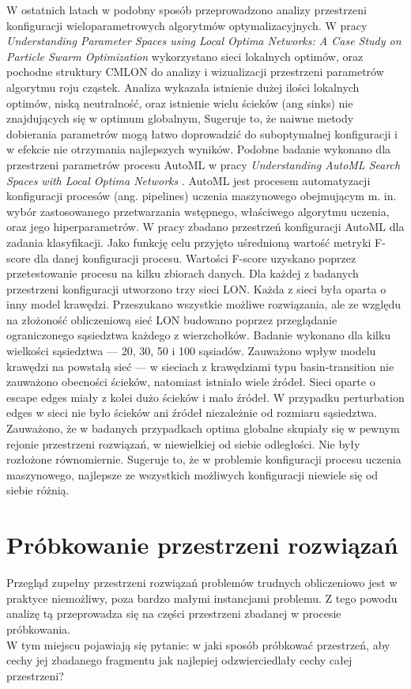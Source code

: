 W ostatnich latach w podobny sposób przeprowadzono analizy przestrzeni konfiguracji wieloparametrowych algorytmów optymalizacyjnych.
W pracy \textit{Understanding Parameter Spaces using Local Optima Networks: A Case Study on Particle Swarm Optimization} \cite{DBLP:conf/gecco/CleghornO21}
wykorzystano sieci lokalnych optimów, oraz pochodne struktury CMLON do analizy i wizualizacji przestrzeni parametrów algorytmu roju cząstek.
Analiza wykazała istnienie dużej ilości lokalnych optimów, niską neutralność, oraz istnienie wielu ścieków (ang sinks) nie znajdujących się w optimum globalnym,
Sugeruje to, że naiwne metody dobierania parametrów mogą łatwo doprowadzić do suboptymalnej konfiguracji i w efekcie nie otrzymania najlepszych wyników.
Podobne badanie wykonano dla przestrzeni parametrów procesu AutoML w pracy \textit{Understanding AutoML Search Spaces with Local Optima Networks} \cite{DBLP:conf/gecco/TeixeiraP22}.
AutoML jest procesem automatyzacji konfiguracji procesów (ang. pipelines) uczenia maszynowego obejmującym m. in. wybór zastosowanego przetwarzania wstępnego,
właściwego algorytmu uczenia, oraz jego hiperparametrów. W pracy zbadano przestrzeń konfiguracji AutoML dla zadania klasyfikacji.
Jako funkcję celu przyjęto uśrednioną wartość metryki F-score dla danej konfiguracji procesu.
Wartości F-score uzyskano poprzez przetestowanie procesu na kilku zbiorach danych.
Dla każdej z badanych przestrzeni konfiguracji utworzono trzy sieci LON. Każda z sieci była oparta o inny model krawędzi.
Przeszukano wszystkie możliwe rozwiązania, ale ze względu na złożoność obliczeniową sieć LON budowano poprzez przeglądanie
ograniczonego sąsiedztwa każdego z wierzchołków. Badanie wykonano dla kilku wielkości sąsiedztwa --- 20, 30, 50 i 100 sąsiadów.
Zauważono wpływ modelu krawędzi na powstałą sieć --- w sieciach z krawędziami typu basin-transition nie zauważono obecności ścieków,
natomiast istniało wiele źródeł. Sieci oparte o escape edges miały z kolei dużo ścieków i mało źródeł.
W przypadku perturbation edges w sieci nie było ścieków ani źródeł niezależnie od rozmiaru sąsiedztwa.
Zauważono, że w badanych przypadkach optima globalne skupiały się w pewnym rejonie przestrzeni rozwiązań, w niewielkiej od siebie odległości.
Nie były rozłożone równomiernie. Sugeruje to, że w problemie konfiguracji procesu uczenia maszynowego, najlepsze ze wszystkich możliwych
konfiguracji niewiele się od siebie różnią.


\section{Próbkowanie przestrzeni rozwiązań}
Przegląd zupełny przestrzeni rozwiązań problemów trudnych obliczeniowo jest w praktyce niemożliwy, poza bardzo małymi instancjami problemu.
Z tego powodu analizę tą przeprowadza się na części przestrzeni zbadanej w procesie próbkowania. \\
W tym miejscu pojawiają się pytanie: w jaki sposób próbkować przestrzeń, aby cechy jej zbadanego fragmentu
jak najlepiej odzwierciedlały cechy całej przestrzeni?

